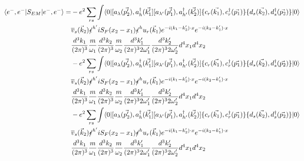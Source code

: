 \documentclass[a4]{article}
\begin{document}
\begin{framed}
            \begin{equation}
                \begin{aligned}
                    \langle e^{-}, e^{-} | S_{EM} | e^{-}, e^{-} \rangle = & - e^{2} \sum_{r s} \int \langle 0 |[a_{\lambda} (\vec{p'_2}),a^{\dagger}_{h} (\vec{k'_1}] [a_{\lambda'} (\vec{p'_1}), a^{\dagger}_{h'} (\vec{k'_2})] \{c_{r} (\vec{k_1}), c^{\dagger}_{r} (\vec{p_1}) \} \{d_{s} (\vec{k_2}), d^{\dagger}_{s} (\vec{p_2}) \}| 0 \rangle \\
                    & \overline{v}_{s} (\vec{k}_2) \slashed{\epsilon}^{h'} i S_{F} (x_2 - x_1) \slashed{\epsilon}^{h} u_{r} (\vec{k}_1) e^{- i (k_1 - k'_2) \cdot x} e^{- i (k_2 - k'_1) \cdot x} \\
                    & \frac{d^3 k_1}{(2 \pi)^{3}} \frac{m}{\omega_1} \frac{d^3 k_2}{(2 \pi)^{3}} \frac{m}{\omega_2} \frac{d^3 k'_1}{(2 \pi)^{3} 2 \omega'_1} \frac{d^3 k'_2}{(2 \pi)^{3} 2 \omega'_2} d^4 x_1 d^4 x_2 \\
                    & - e^{2} \sum_{r s} \int \langle 0 |[a_{\lambda} (\vec{p'_2}),a^{\dagger}_{h} (\vec{k'_1}] [a_{\lambda'} (\vec{p'_1}), a^{\dagger}_{h'} (\vec{k'_2})] \{c_{r} (\vec{k_1}), c^{\dagger}_{r} (\vec{p_1}) \} \{d_{s} (\vec{k_2}), d^{\dagger}_{s} (\vec{p_2}) \}| 0 \rangle \\
                    & \overline{v}_{s} (\vec{k}_2) \slashed{\epsilon}^{h'} i S_{F} (x_2 - x_1) \slashed{\epsilon}^{h} u_{r} (\vec{k}_1) e^{- i (k_1 - k'_2) \cdot x} e^{- i (k_2 - k'_1) \cdot x} \\
                    & \frac{d^3 k_1}{(2 \pi)^{3}} \frac{m}{\omega_1} \frac{d^3 k_2}{(2 \pi)^{3}} \frac{m}{\omega_2} \frac{d^3 k'_1}{(2 \pi)^{3} 2 \omega'_1} \frac{d^3 k'_2}{(2 \pi)^{3} 2 \omega'_2} d^4 x_1 d^4 x_2 \\
                    & - e^{2} \sum_{r s} \int \langle 0 |[a_{\lambda} (\vec{p'_2}),a^{\dagger}_{h} (\vec{k'_1}] [a_{\lambda'} (\vec{p'_1}), a^{\dagger}_{h'} (\vec{k'_2})] \{c_{r} (\vec{k_1}), c^{\dagger}_{r} (\vec{p_1}) \} \{d_{s} (\vec{k_2}), d^{\dagger}_{s} (\vec{p_2}) \}| 0 \rangle \\
                    & \overline{v}_{s} (\vec{k}_2) \slashed{\epsilon}^{h'} i S_{F} (x_2 - x_1) \slashed{\epsilon}^{h} u_{r} (\vec{k}_1) e^{- i (k_1 - k'_2) \cdot x} e^{- i (k_2 - k'_1) \cdot x} \\
                    & \frac{d^3 k_1}{(2 \pi)^{3}} \frac{m}{\omega_1} \frac{d^3 k_2}{(2 \pi)^{3}} \frac{m}{\omega_2} \frac{d^3 k'_1}{(2 \pi)^{3} 2 \omega'_1} \frac{d^3 k'_2}{(2 \pi)^{3} 2 \omega'_2} d^4 x_1 d^4 x_2 \\

\end{aligned}
\end{equation}
\end{framed}
\end{document}
